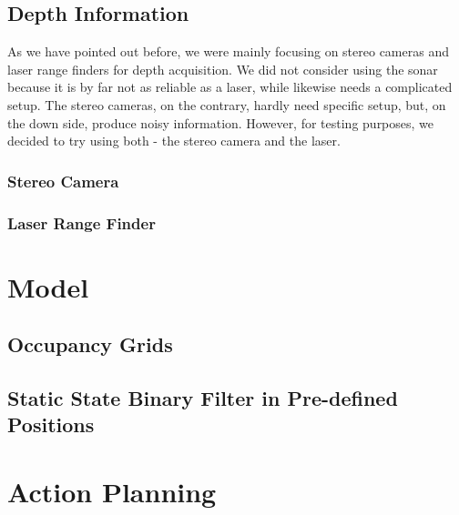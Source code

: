     \subsection{Depth Information} %
    \label{sub:depth_information}
        As we have pointed out before, we were mainly focusing on stereo cameras and laser range finders for depth acquisition. We did not consider using the sonar because it is by far not as reliable as a laser, while likewise needs a complicated setup. The stereo cameras, on the contrary, hardly need specific setup, but, on the down side, produce noisy information. However, for testing purposes, we decided to try using both - the stereo camera and the laser.
        \subsubsection{Stereo Camera} %
        \label{ssub:stereo_camera}
        \subsubsection{Laser Range Finder} %
        \label{ssub:laser_range_finder}

\section{Model} %
\label{sec:model}
\subsection{Occupancy Grids} %
\label{sub:occupancy_grids}

\subsection{Static State Binary Filter in Pre-defined Positions} %
\label{sub:static_state_binary_filter_in_pre_defined_positions}


\section{Action Planning} %
\label{sec:action_planning}

